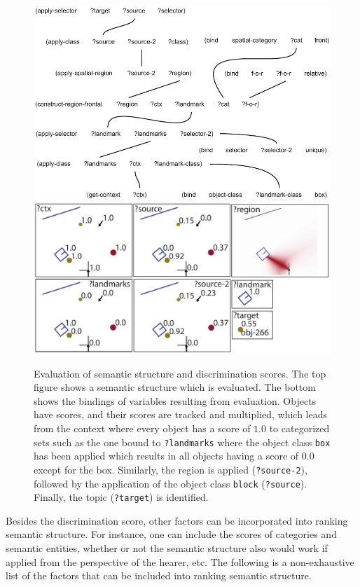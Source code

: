 \begin{figure}
\begin{center}
\includegraphics[width=0.8\columnwidth]{figs/semantic-structure-in-front-of-the-box-relative}
\includegraphics[width=0.8\columnwidth]{figs/semantic-structure-in-front-of-the-box-relative-evaluation}
\end{center}
\caption[Evaluation of semantic structure and discrimination scores]{%
Evaluation of semantic structure and discrimination scores. The top figure 
shows a semantic structure which is evaluated.
The bottom shows the bindings of variables resulting from evaluation. 
Objects have scores, and their scores are tracked and multiplied, which leads from the
context where every object has a score of $1.0$ to categorized sets such as the one
bound to {\footnotesize\tt ?landmarks} where the object class {\footnotesize\tt box} has been applied which 
results in all objects having a score of $0.0$ except for the box. Similarly, the region is applied
({\footnotesize\tt ?source-2}), followed by the application of the object class {\footnotesize\tt block}
({\footnotesize\tt ?source}). Finally, the topic ({\footnotesize\tt ?target}) is identified.}
\label{f:disc-score}
\end{figure}

Besides the discrimination score, other factors can be incorporated
into ranking semantic structure. For instance, one can include
the scores of categories and semantic entities, whether or not 
the semantic structure also would work if applied from the perspective
of the hearer, etc. The following is a non-exhaustive
list of the factors that can be included into ranking semantic
structure.

